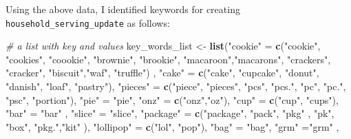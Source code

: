 \documentclass[
]{article}
\newenvironment{Shaded}{\begin{snugshade}}{\end{snugshade}}
\newcommand{\CommentTok}[1]{\textcolor[rgb]{0.56,0.35,0.01}{\textit{#1}}}
\newcommand{\KeywordTok}[1]{\textcolor[rgb]{0.13,0.29,0.53}{\textbf{#1}}}
\newcommand{\NormalTok}[1]{#1}
\newcommand{\StringTok}[1]{\textcolor[rgb]{0.31,0.60,0.02}{#1}}
\begin{document}
Using the above data, I identified keywords for creating
\texttt{household\_serving\_update} as follows:

\begin{Shaded}
\begin{Highlighting}[]
\CommentTok{# a list with key and values }
\NormalTok{key_words_list <-}\StringTok{ }\KeywordTok{list}\NormalTok{(}\StringTok{"cookie"}\NormalTok{ =}\StringTok{ }\KeywordTok{c}\NormalTok{(}\StringTok{"cookie"}\NormalTok{, }\StringTok{"cookies"}\NormalTok{, }\StringTok{"coookie"}\NormalTok{, }\StringTok{"brownie"}\NormalTok{, }\StringTok{"brookie"}\NormalTok{, }\StringTok{"macaroon"}\NormalTok{,}\StringTok{"macarons"}\NormalTok{, }\StringTok{"crackers"}\NormalTok{, }\StringTok{"cracker"}\NormalTok{, }\StringTok{"biscuit"}\NormalTok{,}\StringTok{"waf"}\NormalTok{,}
                           \StringTok{"truffle"}\NormalTok{) ,}
                   \StringTok{"cake"}\NormalTok{ =}\StringTok{ }\KeywordTok{c}\NormalTok{(}\StringTok{"cake"}\NormalTok{, }\StringTok{"cupcake"}\NormalTok{, }\StringTok{"donut"}\NormalTok{, }\StringTok{"danish"}\NormalTok{, }\StringTok{"loaf"}\NormalTok{, }\StringTok{"pastry"}\NormalTok{),}
                   \StringTok{"pieces"}\NormalTok{ =}\StringTok{ }\KeywordTok{c}\NormalTok{(}\StringTok{"piece"}\NormalTok{, }\StringTok{"pieces"}\NormalTok{, }\StringTok{"pcs"}\NormalTok{, }\StringTok{"pcs."}\NormalTok{, }\StringTok{"pc"}\NormalTok{, }\StringTok{"pc."}\NormalTok{, }\StringTok{"psc"}\NormalTok{, }\StringTok{"portion"}\NormalTok{),}
                   \StringTok{"pie"}\NormalTok{ =}\StringTok{ "pie"}\NormalTok{,  }\StringTok{"onz"}\NormalTok{ =}\StringTok{ }\KeywordTok{c}\NormalTok{(}\StringTok{"onz"}\NormalTok{,}\StringTok{"oz"}\NormalTok{),}
                   \StringTok{"cup"}\NormalTok{ =}\StringTok{ }\KeywordTok{c}\NormalTok{(}\StringTok{"cup"}\NormalTok{, }\StringTok{"cups"}\NormalTok{),  }\StringTok{"bar"}\NormalTok{ =}\StringTok{ "bar"}\NormalTok{ , }\StringTok{"slice"}\NormalTok{ =}\StringTok{ "slice"}\NormalTok{,}
                   \StringTok{"package"}\NormalTok{ =}\StringTok{ }\KeywordTok{c}\NormalTok{(}\StringTok{"package"}\NormalTok{, }\StringTok{"pack"}\NormalTok{, }\StringTok{"pkg"}\NormalTok{ , }\StringTok{"pk"}\NormalTok{, }\StringTok{"box"}\NormalTok{, }\StringTok{"pkg."}\NormalTok{,}\StringTok{"kit"}\NormalTok{ ),}
                   \StringTok{"lollipop"}\NormalTok{ =}\StringTok{  }\KeywordTok{c}\NormalTok{(}\StringTok{"lol"}\NormalTok{, }\StringTok{"pop"}\NormalTok{), }\StringTok{"bag"}\NormalTok{ =}\StringTok{ "bag"}\NormalTok{, }\StringTok{"grm"}\NormalTok{ =}\StringTok{"grm"}\NormalTok{ ,}

\end{Highlighting}
\end{Shaded}
\end{document}
